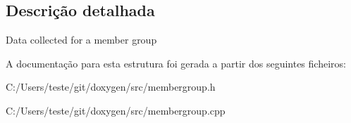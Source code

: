 \subsection{Descrição detalhada}
Data collected for a member group 

A documentação para esta estrutura foi gerada a partir dos seguintes ficheiros\-:\begin{DoxyCompactItemize}
\item 
C\-:/\-Users/teste/git/doxygen/src/membergroup.\-h\item 
C\-:/\-Users/teste/git/doxygen/src/membergroup.\-cpp\end{DoxyCompactItemize}
